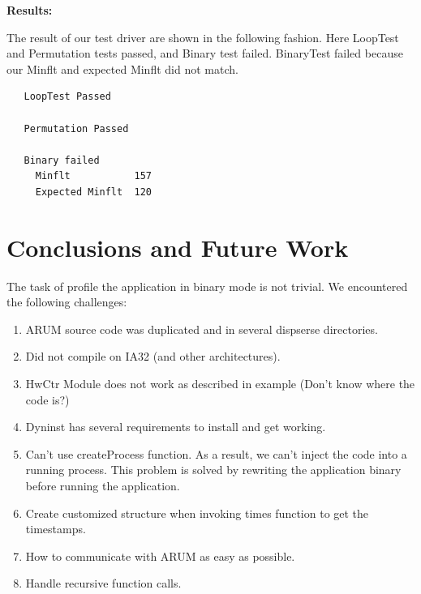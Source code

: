 \documentclass[11pt,letterpaper,oneside]{article}
\begin{document}
{\bf Results:}\newline

The result of our test driver are shown in the following fashion. Here LoopTest and Permutation tests passed, and Binary test failed. BinaryTest failed because our Minflt and expected Minflt did not match. 

\begin{verbatim}
   LoopTest Passed

   Permutation Passed

   Binary failed
     Minflt           157
     Expected Minflt  120
\end{verbatim}

\section{Conclusions and Future Work}
\label{sec:conclusion}
The task of profile the application in binary mode is not trivial. We encountered the following challenges:
\begin{enumerate}
\item ARUM source code was duplicated and in several dispserse directories.  
\item Did not compile on IA32 (and other architectures).
\item HwCtr Module does not work as described in example (Don't know where the code is?)
\item Dyninst has several requirements to install and get working.
\item Can't use createProcess function. As a result, we can't inject the code into a running process. This problem is solved by rewriting the application binary before running the application.
\item Create customized structure when invoking times function to get the timestamps.
\item How to communicate with ARUM as easy as possible.
\item Handle recursive function calls.
\end{enumerate}
\end{document}
